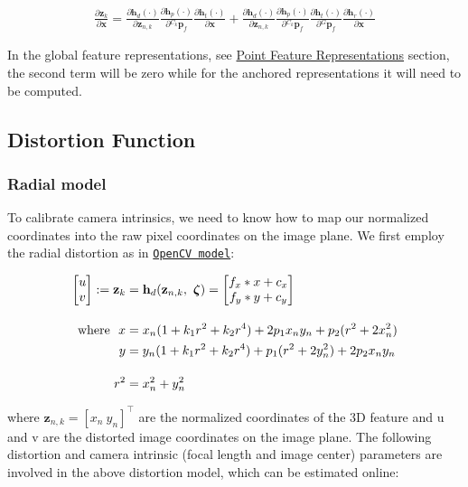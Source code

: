 \begin{align*} \frac{\partial \mathbf{z}_k}{\partial \mathbf{x}} = \frac{\partial \mathbf h_d (\cdot) }{\partial \mathbf{z}_{n,k}} \frac{\partial \mathbf h_p (\cdot) }{\partial {}^{C_k}\mathbf{p}_f} \frac{\partial \mathbf h_t (\cdot) }{\partial \mathbf{x}} + \frac{\partial \mathbf h_d (\cdot) }{\partial \mathbf{z}_{n,k}} \frac{\partial \mathbf h_p (\cdot) }{\partial {}^{C_k}\mathbf{p}_f} \frac{\partial \mathbf h_t (\cdot) }{\partial {}^{G}\mathbf{p}_f} \frac{\partial \mathbf h_r (\cdot) }{\partial \mathbf{x}} \end{align*}

In the global feature representations, see \hyperlink{update-feat_feat-rep}{Point Feature Representations} section, the second term will be zero while for the anchored representations it will need to be computed.\hypertarget{update-feat_distortion}{}\subsection{Distortion Function}\label{update-feat_distortion}
\hypertarget{update-feat_distortion-radtan}{}\subsubsection{Radial model}\label{update-feat_distortion-radtan}
To calibrate camera intrinsics, we need to know how to map our normalized coordinates into the raw pixel coordinates on the image plane. We first employ the radial distortion as in \href{https://docs.opencv.org/3.4/da/d54/group__imgproc__transform.html#details}{\tt Open\+CV model}\+:

\begin{align*} \begin{bmatrix} u \\ v \end{bmatrix}:= \mathbf{z}_k &= \mathbf h_d(\mathbf{z}_{n,k}, ~\boldsymbol\zeta) = \begin{bmatrix} f_x * x + c_x \\ f_y * y + c_y \end{bmatrix}\\[1em] \empty {\rm where}~~ x &= x_n (1 + k_1 r^2 + k_2 r^4) + 2 p_1 x_n y_n + p_2(r^2 + 2 x_n^2) \\\ y &= y_n (1 + k_1 r^2 + k_2 r^4) + p_1 (r^2 + 2 y_n^2) + 2 p_2 x_n y_n \\[1em] r^2 &= x_n^2 + y_n^2 \end{align*}

where $ \mathbf{z}_{n,k} = [ x_n ~ y_n ]^\top$ are the normalized coordinates of the 3D feature and u and v are the distorted image coordinates on the image plane. The following distortion and camera intrinsic (focal length and image center) parameters are involved in the above distortion model, which can be estimated online\+:

